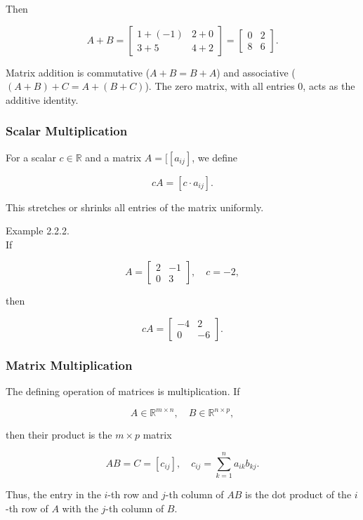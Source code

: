\documentclass[
  12pt,
  a4paper,
]{article}
\begin{document}
Then

\[A + B = \begin{bmatrix}
1 + (-1) & 2 + 0 \\
3 + 5 & 4 + 2
\end{bmatrix}
=
\begin{bmatrix}
0 & 2 \\
8 & 6
\end{bmatrix}.\]

Matrix addition is commutative (\(A+B = B+A\)) and associative
(\((A+B)+C = A+(B+C)\)). The zero matrix, with all entries 0, acts as
the additive identity.

\subsubsection{Scalar Multiplication}\label{scalar-multiplication-2}

For a scalar \(c \in \mathbb{R}\) and a matrix \(A = [[a_{ij}]\), we
define

\[cA = [c \cdot a_{ij}].\]

This stretches or shrinks all entries of the matrix uniformly.

Example 2.2.2.\\
If

\[A = \begin{bmatrix}
2 & -1 \\
0 & 3
\end{bmatrix}, \quad c = -2,\]

then

\[cA = \begin{bmatrix}
-4 & 2 \\
0 & -6
\end{bmatrix}.\]

\subsubsection{Matrix Multiplication}\label{matrix-multiplication}

The defining operation of matrices is multiplication. If

\[A \in \mathbb{R}^{m \times n}, \quad B \in \mathbb{R}^{n \times p},\]

then their product is the \(m \times p\) matrix

\[AB = C = [c_{ij}], \quad c_{ij} = \sum_{k=1}^n a_{ik} b_{kj}.\]

Thus, the entry in the \(i\)-th row and \(j\)-th column of \(AB\) is the
dot product of the \(i\)-th row of \(A\) with the \(j\)-th column of
\(B\).
\end{document}
